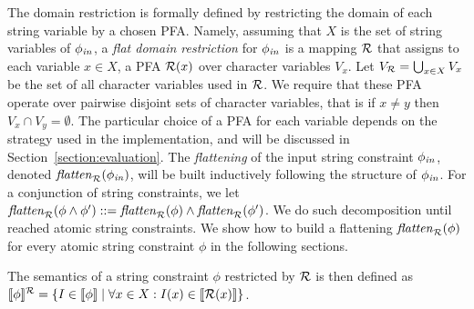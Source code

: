 \documentclass[sigplan,screen]{acmart}
\begin{document}
The domain restriction is formally defined by restricting the domain of each string variable by a chosen PFA. 
%
Namely, assuming that $X$ is the set of string variables of $\phi_{\mathit{in}}$,
a \emph{flat domain restriction} for $\phi_{\mathit{in}}$ is a mapping $\mathcal{R}$ that assigns to each variable $x\in X$, a PFA $\mathcal{R}(x)$ over character variables $V_x$. Let $V_{\mathcal{R}} = \bigcup_{x\in X} V_x$ be the set of all character variables used in $\mathcal{R}$.
We require that these PFA operate over pairwise disjoint sets of character variables, that is if $x\neq y$ then $V_x \cap V_y = \emptyset$.
%
The particular choice of a PFA 
for each variable depends on the strategy used in the implementation, and will be discussed in Section~\ref{section:evaluation}.
%
The \emph{flattening} of the input string constraint $\phi_{\mathit{in}}$, denoted $\mathit{flatten}_{\mathcal{R}}(\phi_{\mathit{in}})$, will be built inductively following the structure of $\phi_{\mathit{in}}$.
For a conjunction of string constraints, we let $\mathit{flatten}_{\mathcal{R}}(\phi \land \phi') ::= \mathit{flatten}_{\mathcal{R}}(\phi) \land \mathit{flatten}_{\mathcal{R}}(\phi')$. We do such decomposition until reached atomic string constraints. We show how to build a flattening $\mathit{flatten}_{\mathcal{R}}(\phi)$ for every atomic string constraint $\phi$ in the following sections.


The semantics of a string constraint $\phi$ restricted by $\mathcal{R}$ is then defined as 
$[\![\phi]\!]^{\mathcal{R}} = \{I\in[\![\phi]\!] \mid \forall x\in X:I(x)\in[\![\mathcal{R}(x)]\!]\}$.
\end{document}
